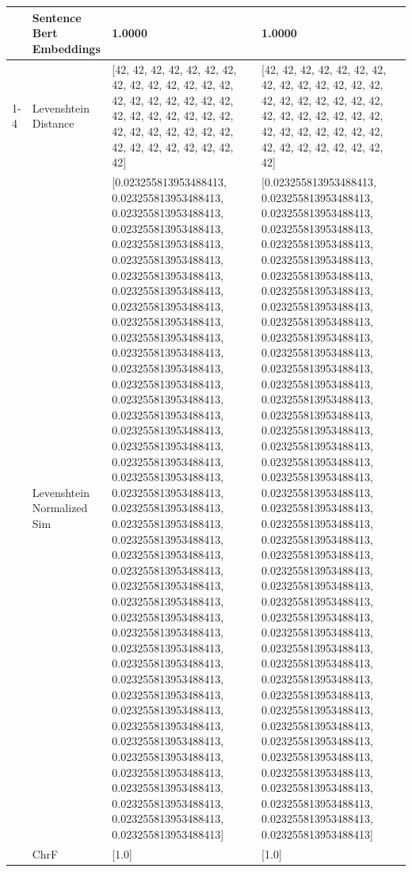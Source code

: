 \begin{tabular}{llll}
 & Sentence Bert Embeddings & 1.0000 & 1.0000 \\
\cline{1-4}
\multirow[t]{4}{*}{Enyang’au tiboyera rituko ri'emosira.} & Levenshtein Distance & [42, 42, 42, 42, 42, 42, 42, 42, 42, 42, 42, 42, 42, 42, 42, 42, 42, 42, 42, 42, 42, 42, 42, 42, 42, 42, 42, 42, 42, 42, 42, 42, 42, 42, 42, 42, 42, 42, 42, 42, 42, 42, 42] & [42, 42, 42, 42, 42, 42, 42, 42, 42, 42, 42, 42, 42, 42, 42, 42, 42, 42, 42, 42, 42, 42, 42, 42, 42, 42, 42, 42, 42, 42, 42, 42, 42, 42, 42, 42, 42, 42, 42, 42, 42, 42, 42] \\
 & Levenshtein Normalized Sim & [0.023255813953488413, 0.023255813953488413, 0.023255813953488413, 0.023255813953488413, 0.023255813953488413, 0.023255813953488413, 0.023255813953488413, 0.023255813953488413, 0.023255813953488413, 0.023255813953488413, 0.023255813953488413, 0.023255813953488413, 0.023255813953488413, 0.023255813953488413, 0.023255813953488413, 0.023255813953488413, 0.023255813953488413, 0.023255813953488413, 0.023255813953488413, 0.023255813953488413, 0.023255813953488413, 0.023255813953488413, 0.023255813953488413, 0.023255813953488413, 0.023255813953488413, 0.023255813953488413, 0.023255813953488413, 0.023255813953488413, 0.023255813953488413, 0.023255813953488413, 0.023255813953488413, 0.023255813953488413, 0.023255813953488413, 0.023255813953488413, 0.023255813953488413, 0.023255813953488413, 0.023255813953488413, 0.023255813953488413, 0.023255813953488413, 0.023255813953488413, 0.023255813953488413, 0.023255813953488413, 0.023255813953488413] & [0.023255813953488413, 0.023255813953488413, 0.023255813953488413, 0.023255813953488413, 0.023255813953488413, 0.023255813953488413, 0.023255813953488413, 0.023255813953488413, 0.023255813953488413, 0.023255813953488413, 0.023255813953488413, 0.023255813953488413, 0.023255813953488413, 0.023255813953488413, 0.023255813953488413, 0.023255813953488413, 0.023255813953488413, 0.023255813953488413, 0.023255813953488413, 0.023255813953488413, 0.023255813953488413, 0.023255813953488413, 0.023255813953488413, 0.023255813953488413, 0.023255813953488413, 0.023255813953488413, 0.023255813953488413, 0.023255813953488413, 0.023255813953488413, 0.023255813953488413, 0.023255813953488413, 0.023255813953488413, 0.023255813953488413, 0.023255813953488413, 0.023255813953488413, 0.023255813953488413, 0.023255813953488413, 0.023255813953488413, 0.023255813953488413, 0.023255813953488413, 0.023255813953488413, 0.023255813953488413, 0.023255813953488413] \\
 & ChrF & [1.0] & [1.0] \\

\end{tabular}
